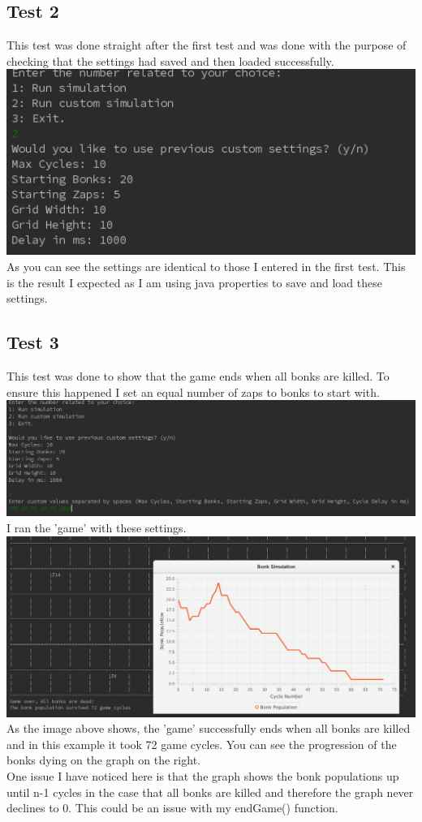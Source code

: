 \documentclass[12pt]{article}
\begin{document}
\subsection{Test 2}
This test was done straight after the first test and was done with the purpose of checking that the settings had saved and then loaded successfully.
\includegraphics[width=15cm]{test2}
As you can see the settings are identical to those I entered in the first test. This is the result I expected as I am using java properties to save and load these settings.

\subsection{Test 3}
This test was done to show that the game ends when all bonks are killed. To ensure this happened I set an equal number of zaps to bonks to start with.\\
\includegraphics[width=15cm]{test3a}
I ran the 'game' with these settings.\\
\includegraphics[width=15cm]{test3b}
As the image above shows, the 'game' successfully ends when all bonks are killed and in this example it took 72 game cycles. You can see the progression of the bonks dying on the graph on the right.\\ 
One issue I have noticed here is that the graph shows the bonk populations up until n-1 cycles in the case that all bonks are killed and therefore the graph never declines to 0. This could be an issue with my endGame() function.
\end{document}
